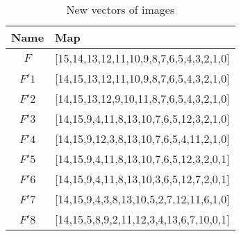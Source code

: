 \documentclass[conference]{IEEEtran}
\begin{document}
\begin{table}
\centering
\begin{tabular}{|c|l|}
\hline
Name & Map \\
\hline
$F$&[15,14,13,12,11,10,9,8,7,6,5,4,3,2,1,0]\\
\hline
$F'1$&[14,15,13,12,11,10,9,8,7,6,5,4,3,2,1,0]\\
\hline
$F'2$&[14,15,13,12,9,10,11,8,7,6,5,4,3,2,1,0]\\
\hline
$F'3$&[14,15,9,4,11,8,13,10,7,6,5,12,3,2,1,0]\\
\hline
$F'4$&[14,15,9,12,3,8,13,10,7,6,5,4,11,2,1,0]\\
\hline
$F'5$&[14,15,9,4,11,8,13,10,7,6,5,12,3,2,0,1]\\
\hline
$F'6$&[14,15,9,4,11,8,13,10,3,6,5,12,7,2,0,1]\\
\hline
$F'7$&[14,15,9,4,3,8,13,10,5,2,7,12,11,6,1,0]\\
\hline
$F'8$&[14,15,5,8,9,2,11,12,3,4,13,6,7,10,0,1]\\
\hline
\end{tabular}
\caption{New vectors of images}
\label{New vectors of images}
\end{table}
\end{document}
